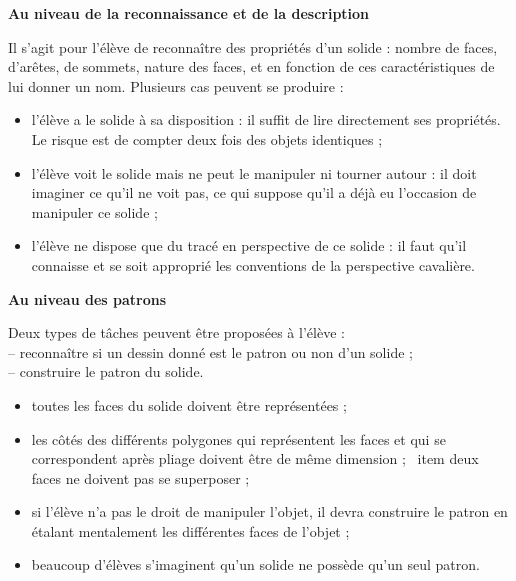 \smallskip

{\bf Au niveau de la reconnaissance et de la description}

Il s'agit pour l'élève de reconnaître des propriétés d'un solide : nombre de faces,  d'arêtes, de sommets, nature des faces, et en fonction de ces caractéristiques de lui donner un nom. Plusieurs cas peuvent se produire :
{\renewcommand{\StringDOCUMENTATION}{Difficultés}
\begin{documentation}
\begin{itemize}
   \item l'élève a le solide à sa disposition : il suffit de lire directement ses propriétés. Le risque est de compter deux fois des objets identiques ;
   \item l'élève voit le solide mais ne peut le manipuler ni tourner autour : il doit imaginer ce qu'il ne voit pas, ce qui suppose qu'il a déjà eu l'occasion de manipuler ce solide ;
   \item l'élève ne dispose que du tracé en perspective de ce solide : il faut qu'il connaisse et se soit approprié les conventions de la perspective cavalière. \\ [-7mm]
\end{itemize}
\end{documentation}}

\bigskip

{\bf Au niveau des patrons}

Deux types de tâches peuvent être proposées à l'élève : \\
   -- reconnaître si un dessin donné est le patron ou non d'un solide ; \\
   -- construire le patron du solide.

{\renewcommand{\StringDOCUMENTATION}{Difficultés}
\begin{documentation}
\begin{itemize}
   \item toutes les faces du solide doivent être représentées ;
   \item les côtés des différents polygones qui représentent les faces et qui se correspondent après pliage doivent être de même dimension ;
   \ item deux faces ne doivent pas se superposer ;
   \item si l'élève n'a  pas le droit de manipuler l'objet, il devra construire le patron en étalant mentalement les différentes faces de l'objet ;
   \item beaucoup d'élèves s'imaginent qu'un solide ne possède qu'un seul patron. \\ [-7mm]
\end{itemize}
\end{documentation}}


